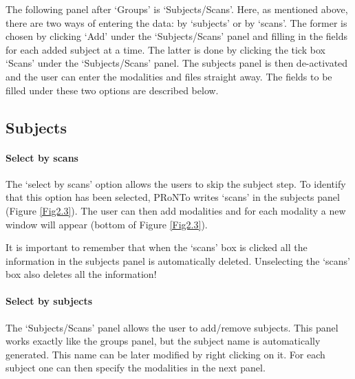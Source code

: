 The following panel after `Groups' is `Subjects/Scans'. Here, as mentioned above, there are two ways of entering the data: by `subjects' or by `scans'. The former is chosen by clicking `Add' under the `Subjects/Scans' panel and filling in the fields for each added subject at a time. The latter is done by clicking the tick box `Scans' under the `Subjects/Scans' panel. The subjects panel is then de-activated and the user can enter the modalities and files straight away. The fields to be filled under these two options are described below.

\subsection{Subjects}

\paragraph{Select by scans} The `select by scans' option allows the users to skip the subject step. To identify that this option has been selected, PRoNTo writes `scans' in the subjects panel (Figure \ref{Fig2.3}). The user can then add modalities and for each modality a new window will appear (bottom of Figure \ref{Fig2.3}). 

It is important to remember that when the `scans' box is clicked all the information in the subjects panel is
automatically deleted. 
Unselecting the `scans' box also deletes all the information!

\paragraph{Select by subjects} The `Subjects/Scans' panel allows the user to add/remove subjects. This panel works exactly like the groups panel, but the subject name is automatically generated. This name can be later modified by right clicking on it. For each subject one can then specify the modalities in the next panel.

